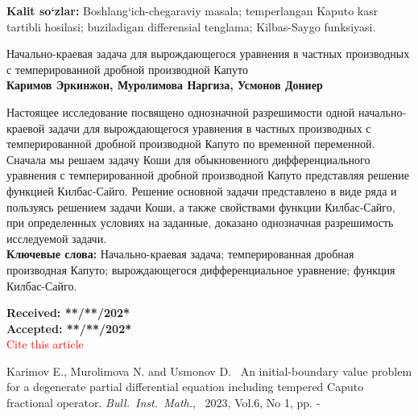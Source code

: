 \documentclass{article}
\begin{document}
\medskip
{{\bf Kalit so`zlar:} Boshlang`ich-chegaraviy masala; temperlangan Kaputo kasr tartibli hosilasi; buziladigan differensial tenglama; Kilbas-Saygo funksiyasi.}\\

\bigskip

\begin{center}
{\sc Начально-краевая задача для вырождающегося уравнения в частных производных с темперированной дробной производной Капуто }\\
{\bf Каримов Эркинжон, Муролимова Наргиза, Усмонов Дониер}\\
\end{center}
\medskip

{Настоящее исследование посвящено однозначной разрешимости одной начально-краевой задачи для вырождающегося уравнения в частных производных с темперированной дробной производной Капуто по временной переменной. Сначала мы решаем задачу Коши для обыкновенного дифференциального уравнения с темперированной дробной производной Капуто представляя решение функцией Килбас-Сайго. Решение основной задачи представлено в виде ряда и пользуясь решением задачи Коши, а также свойствами функции Килбас-Сайго, при определенных условиях на заданные, доказано однозначная разрешимость исследуемой задачи.}\\

\medskip
{{\bf Ключевые слова:} Начально-краевая задача; темперированная дробная производная Капуто; вырождающегося дифференциальное уравнение; функция Килбас-Сайго.}\\

\bigskip

\textbf{Received: **/**/202*}\\

\textbf{Accepted: **/**/202*}\\


\bigskip
\textcolor{red}{\Large Cite this article}

Karimov E., Murolimova N. and Usmonov D.~ {An initial-boundary value problem for a degenerate partial differential equation including tempered Caputo fractional operator.}  \textit{Bull.~Inst.~Math.},~ 2023, Vol.6, No 1, pp. \pageref{firstpage}-\pageref{lastpage}


\label{lastpage}
\end{document}
